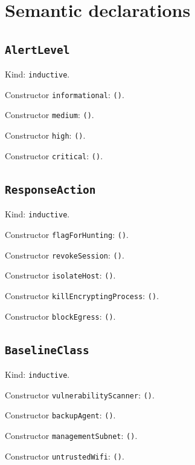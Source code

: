 \documentclass[11pt]{article}
\begin{document}
\section*{Semantic declarations}
\subsection*{\texttt{AlertLevel}}
\noindent Kind: \texttt{inductive}.\par
\noindent Constructor \texttt{informational}: \texttt{()}.\par
\noindent Constructor \texttt{medium}: \texttt{()}.\par
\noindent Constructor \texttt{high}: \texttt{()}.\par
\noindent Constructor \texttt{critical}: \texttt{()}.\par
\subsection*{\texttt{ResponseAction}}
\noindent Kind: \texttt{inductive}.\par
\noindent Constructor \texttt{flagForHunting}: \texttt{()}.\par
\noindent Constructor \texttt{revokeSession}: \texttt{()}.\par
\noindent Constructor \texttt{isolateHost}: \texttt{()}.\par
\noindent Constructor \texttt{killEncryptingProcess}: \texttt{()}.\par
\noindent Constructor \texttt{blockEgress}: \texttt{()}.\par
\subsection*{\texttt{BaselineClass}}
\noindent Kind: \texttt{inductive}.\par
\noindent Constructor \texttt{vulnerabilityScanner}: \texttt{()}.\par
\noindent Constructor \texttt{backupAgent}: \texttt{()}.\par
\noindent Constructor \texttt{managementSubnet}: \texttt{()}.\par
\noindent Constructor \texttt{untrustedWifi}: \texttt{()}.\par
\end{document}
